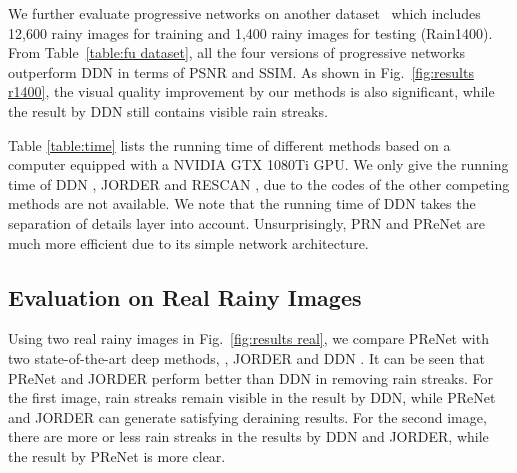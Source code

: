 \documentclass[10pt,twocolumn,letterpaper]{article}
\begin{document}
We further evaluate progressive networks on another dataset~\cite{fu2017removing} which includes 12,600 rainy images for training and 1,400 rainy images for testing (Rain1400).
From Table~\ref{table:fu dataset}, all the four versions of progressive networks outperform DDN in terms of PSNR and SSIM.
As shown in Fig.~\ref{fig:results r1400}, the visual quality improvement by our methods is also significant, while the result by DDN still contains visible rain streaks.


Table \ref{table:time} lists the running time of different methods based on a computer equipped with a NVIDIA GTX 1080Ti GPU.
We only give the running time of DDN \cite{fu2017removing}, JORDER \cite{yang2017deep} and RESCAN \cite{li2018recurrent}, due to the codes of the other competing methods are not available.
We note that the running time of DDN \cite{fu2017removing} takes the separation of details layer into account.
Unsurprisingly, PRN and PReNet are much more efficient due to its simple network architecture.




\subsection{Evaluation on Real Rainy Images}

Using two real rainy images in Fig.~\ref{fig:results real}, we compare PReNet with two state-of-the-art deep methods, \ie, JORDER \cite{yang2017deep} and DDN \cite{fu2017removing}.
It can be seen that PReNet and JORDER perform better than DDN in removing rain streaks.
For the first image, rain streaks remain visible in the result by DDN, while PReNet and JORDER can generate satisfying deraining results.
For the second image, there are more or less rain streaks in the results by DDN and JORDER, while the result by PReNet is more clear.
\end{document}

